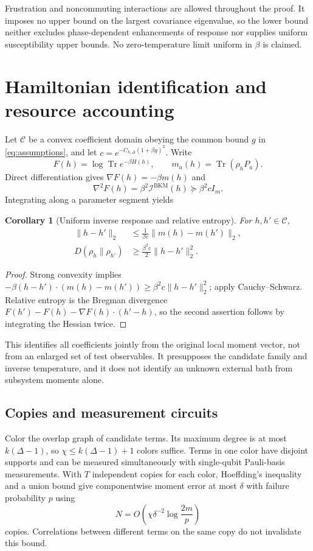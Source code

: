 \documentclass[11pt]{article}
\newtheorem{corollary}[theorem]{Corollary}
\theoremstyle{remark}\newtheorem{remark}[theorem]{Remark}
\DeclareMathOperator{\Tr}{Tr}\DeclareMathOperator{\supp}{supp}\DeclareMathOperator{\ad}{ad}\DeclareMathOperator{\Var}{Var}\DeclareMathOperator{\Cov}{Cov}\DeclareMathOperator{\rank}{rank}\DeclareMathOperator{\dist}{dist}
\begin{document}
Frustration and noncommuting interactions are allowed throughout the proof. It imposes no upper bound on the largest covariance eigenvalue, so the lower bound neither excludes phase-dependent enhancements of response nor supplies uniform susceptibility upper bounds. No zero-temperature limit uniform in $\beta$ is claimed.

\section{Hamiltonian identification and resource accounting}
Let $\mathcal C$ be a convex coefficient domain obeying the common bound $g$ in \eqref{eq:assumptions}, and let $c=e^{-C_{k,\Delta}(1+\beta g)^2}$. Write
\[
 F(h)=\log\Tr e^{-\beta H(h)},\qquad m_a(h)=\Tr(\rho_hP_a).
\]
Direct differentiation gives $\nabla F(h)=-\beta m(h)$ and
\begin{equation}
 \nabla^2F(h)=\beta^2\mathcal I^{\mathrm{BKM}}(h)\succeq\beta^2c I_m.
\end{equation}
Integrating along a parameter segment yields
\begin{corollary}[Uniform inverse response and relative entropy]
For $h,h'\in\mathcal C$,
\begin{align}\label{eq:inverse}
 \|h-h'\|_2&\le\frac1{\beta c}\|m(h)-m(h')\|_2,\\
 D(\rho_h\|\rho_{h'})&\ge\frac{\beta^2c}{2}\|h-h'\|_2^2.\label{eq:entropy}
\end{align}
\end{corollary}
\begin{proof}
Strong convexity implies $-\beta(h-h')\cdot(m(h)-m(h'))\ge\beta^2c\|h-h'\|_2^2$; apply Cauchy--Schwarz. Relative entropy is the Bregman divergence $F(h')-F(h)-\nabla F(h)\cdot(h'-h)$, so the second assertion follows by integrating the Hessian twice.
\end{proof}
This identifies all coefficients jointly from the original local moment vector, not from an enlarged set of test observables. It presupposes the candidate family and inverse temperature, and it does not identify an unknown external bath from subsystem moments alone.

\subsection{Copies and measurement circuits}
Color the overlap graph of candidate terms. Its maximum degree is at most $k(\Delta-1)$, so $\chi\le k(\Delta-1)+1$ colors suffice. Terms in one color have disjoint supports and can be measured simultaneously with single-qubit Pauli-basis measurements. With $T$ independent copies for each color, Hoeffding's inequality and a union bound give componentwise moment error at most $\delta$ with failure probability $p$ using
\[
 N=O\!\left(\chi\delta^{-2}\log\frac{2m}{p}\right)
\]
copies. Correlations between different terms on the same copy do not invalidate this bound.
\end{document}
